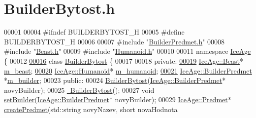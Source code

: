 \hypertarget{BuilderBytost_8h_source}{}\section{Builder\+Bytost.\+h}
\label{BuilderBytost_8h_source}

\begin{DoxyCode}
00001 
00004 \textcolor{preprocessor}{#ifndef BUILDERBYTOST\_H}
00005 \textcolor{preprocessor}{#define BUILDERBYTOST\_H}
00006 
00007 \textcolor{preprocessor}{#include "\hyperlink{BuilderPredmet_8h}{BuilderPredmet.h}"}
00008 \textcolor{preprocessor}{#include "\hyperlink{Beast_8h}{Beast.h}"}
00009 \textcolor{preprocessor}{#include "\hyperlink{Humanoid_8h}{Humanoid.h}"}
00010 
00011 \textcolor{keyword}{namespace }\hyperlink{namespaceIceAge}{IceAge} \{
00012 
\hypertarget{BuilderBytost_8h_source.tex_l00016}{}\hyperlink{classIceAge_1_1BuilderBytost}{00016}     \textcolor{keyword}{class }\hyperlink{classIceAge_1_1BuilderBytost}{BuilderBytost} \{
00017 
00018     \textcolor{keyword}{private}:
\hypertarget{BuilderBytost_8h_source.tex_l00019}{}\hyperlink{classIceAge_1_1BuilderBytost_a220df66c99fac9d382f5d1825f5295de}{00019}         \hyperlink{classIceAge_1_1Beast}{IceAge::Beast}* \hyperlink{classIceAge_1_1BuilderBytost_a220df66c99fac9d382f5d1825f5295de}{m\_beast};
\hypertarget{BuilderBytost_8h_source.tex_l00020}{}\hyperlink{classIceAge_1_1BuilderBytost_a3f4076d50f5bf435c3a90fc123d807a2}{00020}         \hyperlink{classIceAge_1_1Humanoid}{IceAge::Humanoid}* \hyperlink{classIceAge_1_1BuilderBytost_a3f4076d50f5bf435c3a90fc123d807a2}{m\_humanoid};
\hypertarget{BuilderBytost_8h_source.tex_l00021}{}\hyperlink{classIceAge_1_1BuilderBytost_a39f10b26bcda8142ce353e6ca761cabb}{00021}         \hyperlink{classIceAge_1_1BuilderPredmet}{IceAge::BuilderPredmet} *\hyperlink{classIceAge_1_1BuilderBytost_a39f10b26bcda8142ce353e6ca761cabb}{m\_builder}; 
00023     \textcolor{keyword}{public}:
00024         \hyperlink{classIceAge_1_1BuilderBytost_a4f7fcb1e80137c5555a0eb004fca5c19}{BuilderBytost}(\hyperlink{classIceAge_1_1BuilderPredmet}{IceAge::BuilderPredmet}* novyBuilder); 
00025         \hyperlink{classIceAge_1_1BuilderBytost_ac090a25d213bcbe4ca3a9d7a21db1d36}{~BuilderBytost}();
00027         \textcolor{keywordtype}{void} \hyperlink{classIceAge_1_1BuilderBytost_a4fcc673dabd0c27c892698e4956d86ca}{setBuilder}(\hyperlink{classIceAge_1_1BuilderPredmet}{IceAge::BuilderPredmet}* novyBuilder); 
00029         \hyperlink{classIceAge_1_1Predmet}{IceAge::Predmet}* \hyperlink{classIceAge_1_1BuilderBytost_a3b86534905ea6bb1702a6e8d6d3729c7}{createPredmet}(std::string novyNazev, \textcolor{keywordtype}{short} novaHodnota

\end{DoxyCode}
